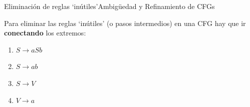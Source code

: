 \documentclass[spanish]{beamer}
\begin{document}
\begin{frame}{Eliminación de reglas `inútiles'}{Ambigüedad y Refinamiento de CFGs}

    Para eliminar las reglas `inútiles' (o pasos intermedios) en una CFG hay que ir \textbf{conectando} los extremos: \pause

    \bigskip

    \begin{enumerate}
        \item $S \to aSb$
        \item $S \to ab$
        \item \alert<3->{$S \to V$}
        \item \alert<3->{$V \to a$}
    \end{enumerate} \pause

    \bigskip



    
\end{frame}


% 
% 
\end{document}
